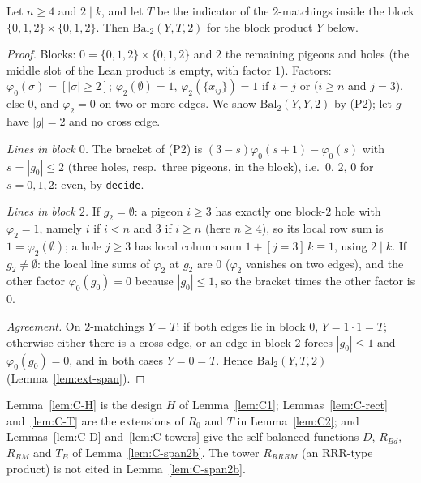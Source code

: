 \begin{lemma}\label{lem:C-T}
Let $n\ge4$ and $2\mid k$, and let $T$ be the indicator of the $2$-matchings inside the
block $\{0,1,2\}\times\{0,1,2\}$.  Then $\mathrm{Bal}_2(Y,T,2)$ for the block product $Y$
below.
\end{lemma}

\begin{proof}
Blocks: $0=\{0,1,2\}\times\{0,1,2\}$ and $2$ the remaining pigeons and holes (the middle
slot of the Lean product is empty, with factor $1$).  Factors: $\varphi_0(\sigma)=[|\sigma|\ge2]$;
$\varphi_2(\emptyset)=1$, $\varphi_2(\{x_{ij}\})=1$ if $i=j$ or ($i\ge n$ and $j=3$), else $0$,
and $\varphi_2=0$ on two or more edges.  We show
$\mathrm{Bal}_2(Y,Y,2)$ by (P2); let $g$ have $|g|=2$ and no cross edge.

\emph{Lines in block $0$.}  The bracket of (P2) is $(3-s)\varphi_0(s+1)-\varphi_0(s)$ with
$s=|g_0|\le2$ (three holes, resp.\ three pigeons, in the block), i.e.\ $0$, $2$, $0$ for
$s=0,1,2$: even, by \texttt{decide}.

\emph{Lines in block $2$.}  If $g_2=\emptyset$: a pigeon $i\ge3$ has exactly one block-$2$ hole
with $\varphi_2=1$, namely $i$ if $i<n$ and $3$ if $i\ge n$ (here $n\ge4$), so its local row
sum is $1=\varphi_2(\emptyset)$; a hole $j\ge3$ has local column sum
$1+[j=3]\,k\equiv1$, using $2\mid k$.  If $g_2\ne\emptyset$: the local
line sums of $\varphi_2$ at $g_2$ are $0$ ($\varphi_2$ vanishes on two edges), and the other
factor $\varphi_0(g_0)=0$ because $|g_0|\le1$, so the bracket times the other factor is $0$.

\emph{Agreement.}  On $2$-matchings $Y=T$: if both edges lie in block $0$, $Y=1\cdot1=T$;
otherwise either there is a cross edge, or an edge in block $2$ forces $|g_0|\le1$ and
$\varphi_0(g_0)=0$, and in both cases $Y=0=T$.  Hence
$\mathrm{Bal}_2(Y,T,2)$ (Lemma~\ref{lem:ext-span}).
\end{proof}

Lemma~\ref{lem:C-H} is the design $H$ of Lemma~\ref{lem:C1}; Lemmas~\ref{lem:C-rect}
and~\ref{lem:C-T} are the extensions of $R_0$ and $T$ in Lemma~\ref{lem:C2}; and
Lemmas~\ref{lem:C-D} and~\ref{lem:C-towers} give the self-balanced functions $D$,
$R_{Bd}$, $R_{RM}$ and $T_B$ of Lemma~\ref{lem:C-span2b}.  The tower $R_{RRRM}$ (an
RRR-type product) is not cited in Lemma~\ref{lem:C-span2b}.


